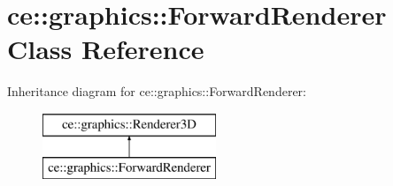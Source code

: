 \hypertarget{classce_1_1graphics_1_1_forward_renderer}{}\section{ce\+:\+:graphics\+:\+:Forward\+Renderer Class Reference}
\label{classce_1_1graphics_1_1_forward_renderer}
Inheritance diagram for ce\+:\+:graphics\+:\+:Forward\+Renderer\+:\begin{figure}[H]
\begin{center}
\leavevmode
\includegraphics[height=2.000000cm]{classce_1_1graphics_1_1_forward_renderer}
\end{center}
\end{figure}
